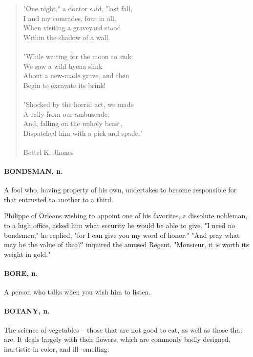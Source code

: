 \documentclass[11pt]{article}
\begin{document}
\begin{quote}   "One night," a doctor said, "last fall, \\
  I and my comrades, four in all, \\
      When visiting a graveyard stood \\
  Within the shadow of a wall. \\
 \\
  "While waiting for the moon to sink \\
  We saw a wild hyena slink \\
      About a new-made grave, and then \\
  Begin to excavate its brink! \\
 \\
  "Shocked by the horrid act, we made \\
  A sally from our ambuscade, \\
      And, falling on the unholy beast, \\
  Dispatched him with a pick and spade." \\
 \\
Bettel K. Jhones \end{quote}


\paragraph{BONDSMAN, n.}  A fool who, having property of his own, undertakes to
become responsible for that entrusted to another to a third.

Philippe of Orleans wishing to appoint one of his favorites, a
dissolute nobleman, to a high office, asked him what security he would
be able to give.  "I need no bondsmen," he replied, "for I can give
you my word of honor."  "And pray what may be the value of that?"
inquired the amused Regent.  "Monsieur, it is worth its weight in gold."

\paragraph{BORE, n.}  A person who talks when you wish him to listen.

\paragraph{BOTANY, n.}  The science of vegetables -- those that are not good to
eat, as well as those that are.  It deals largely with their flowers,
which are commonly badly designed, inartistic in color, and ill-
smelling.
\end{document}

